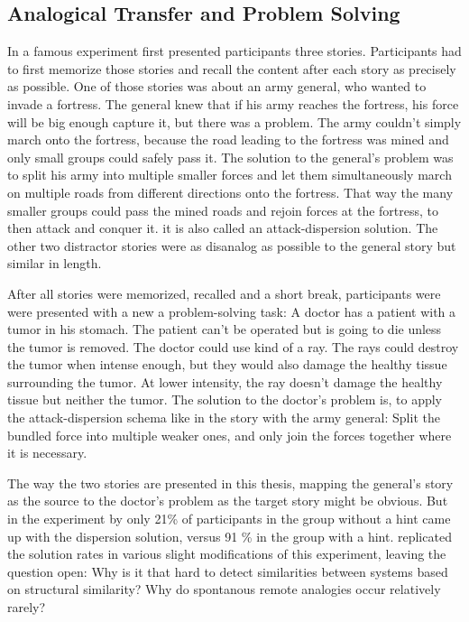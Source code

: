 \documentclass[a4paper,man,natbib,floatsintext,import]{apa6}
\begin{document}
\subsection{Analogical Transfer and Problem Solving}
In a famous experiment \cite{Gick1980} first presented participants three stories. Participants had to first memorize those stories and recall the content after each story as precisely as possible. One of those stories was about an army general, who wanted to invade a fortress. The general knew that if his army reaches the fortress, his force will be big enough capture it, but there was a problem. The army couldn't simply march onto the fortress, because the road leading to the fortress was mined and only small groups could safely pass it. The solution to the general's problem was to split his army into multiple smaller forces and let them simultaneously march on multiple roads from different directions onto the fortress. That way the many smaller groups could pass the mined roads and rejoin forces at the fortress, to then attack and conquer it. it is also called an attack-dispersion solution. The other two distractor stories were as disanalog as possible to the general story but similar in length.

After all stories were memorized, recalled and a short break, participants were were presented with a new a problem-solving task: A doctor has a patient with a tumor in his stomach. The patient can't be operated but is going to die unless the tumor is removed. The doctor could use kind of a ray. The rays could destroy the tumor when intense enough, but they would also damage the healthy tissue surrounding the tumor. At lower intensity, the ray doesn't damage the healthy tissue but neither the tumor. The solution to the doctor's problem is, to apply the attack-dispersion schema like in the story with the army general: Split the bundled force into multiple weaker ones, and only join the forces together where it is necessary.

The way the two stories are presented in this thesis, mapping the general's story as the source to the doctor's problem as the target story might be obvious. But in the experiment by \cite{Gick1980} only 21\% of participants in the group without a hint came up with the dispersion solution, versus 91 \% in the group with a hint. \cite{Gick1983} replicated the solution rates in various slight modifications of this experiment, leaving the question open: Why is it that hard to detect similarities between systems based on structural similarity? Why do spontanous remote analogies occur relatively rarely?
\end{document}
